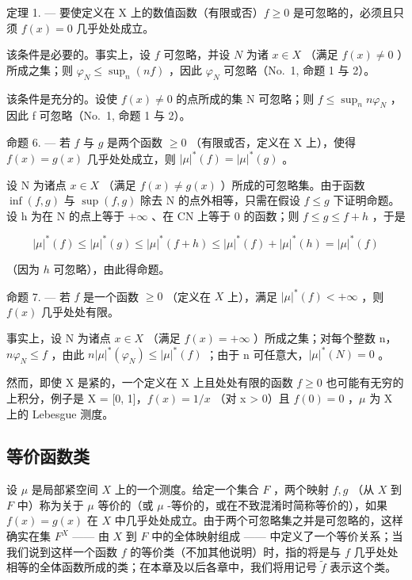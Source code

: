 定理 1. --- 要使定义在 X 上的数值函数（有限或否）\(f \geqslant 0\) 是可忽略的，必须且只须 \(f(x) = 0\) 几乎处处成立。

该条件是必要的。事实上，设 \(f\) 可忽略，并设 \(N\) 为诸 \(x \in X\) （满足 \(f(x) \neq 0\) ）所成之集；则 \(\varphi_N \leqslant \sup_n (nf)\) ，因此 \(\varphi_N\) 可忽略（No.~1, 命题 1 与 2）。

该条件是充分的。设使 \(f(x) \neq 0\) 的点所成的集 N 可忽略；则 \(f \leqslant \sup_{n} n\varphi_{N}\) ，因此 f 可忽略（No.~1, 命题 1 与 2）。

命题 6. --- 若 \(f\) 与 \(g\) 是两个函数 \(\geqslant 0\) （有限或否，定义在 X 上），使得 \(f(x) = g(x)\) 几乎处处成立，则 \(|\mu|^*(f) = |\mu|^*(g)\) 。

设 N 为诸点 \(x \in X\) （满足 \(f(x) \neq g(x)\) ）所成的可忽略集。由于函数 \(\inf(f, g)\) 与 \(\sup(f, g)\) 除去 N 的点外相等，只需在假设 \(f \leqslant g\) 下证明命题。设 h 为在 N 的点上等于 \(+\infty\) 、在 CN 上等于 0 的函数；则 \(f \leqslant g \leqslant f + h\) ，于是

\[
| \mu | ^ {*} (f) \leqslant | \mu | ^ {*} (g) \leqslant | \mu | ^ {*} (f + h) \leqslant | \mu | ^ {*} (f) + | \mu | ^ {*} (h) = | \mu | ^ {*} (f)
\]

（因为 \(h\) 可忽略），由此得命题。

命题 7. --- 若 \(f\) 是一个函数 \(\geqslant 0\) （定义在 \(X\) 上），满足 \(|\mu|^*(f) < +\infty\) ，则 \(f(x)\) 几乎处处有限。

事实上，设 N 为诸点 \(x \in X\) （满足 \(f(x) = +\infty\) ）所成之集；对每个整数 n，\(n\varphi_{N} \leqslant f\) ，由此 \(n|\mu|^{*}(\varphi_{N}) \leqslant |\mu|^{*}(f)\) ；由于 n 可任意大，\(|\mu|^{*}(N) = 0\) 。

然而，即使 X 是紧的，一个定义在 X 上且处处有限的函数 \(f \geqslant 0\) 也可能有无穷的上积分，例子是 X = {[}0, 1{]}，\(f(x) = 1/x\) （对 x \textgreater{} 0）且 \(f(0) = 0\) ，\(\mu\) 为 X 上的 Lebesgue 测度。

\subsection{等价函数类}

设 \(\mu\) 是局部紧空间 \(X\) 上的一个测度。给定一个集合 \(F\) ，两个映射 \(f, g\) （从 \(X\) 到 \(F\) 中）称为关于 \(\mu\) 等价的（或 \(\mu\) -等价的，或在不致混淆时简称等价的），如果 \(f(x) = g(x)\) 在 \(X\) 中几乎处处成立。由于两个可忽略集之并是可忽略的，这样确实在集 \(F^X\) —— 由 \(X\) 到 \(F\) 中的全体映射组成 —— 中定义了一个等价关系；当我们说到这样一个函数 \(f\) 的等价类（不加其他说明）时，指的将是与 \(f\) 几乎处处相等的全体函数所成的类；在本章及以后各章中，我们将用记号 \(\widetilde{f}\) 表示这个类。

